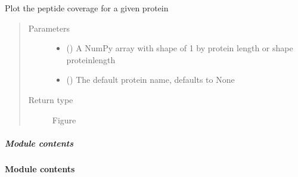 \documentclass[letterpaper,10pt,english]{sphinxmanual}
\begin{document}

\begin{fulllineitems}
\label{\detokenize{IPTK.Visualization:IPTK.Visualization.vizTools.plotly_protein_coverage}}
Plot the peptide coverage for a given protein
\begin{quote}\begin{description}
\item[{Parameters}] \leavevmode\begin{itemize}
\item {} 
 () \textendash{} A NumPy array with shape of 1 by protein length or shape protein\sphinxhyphen{}length

\item {} 
 (\sphinxstyleliteralemphasis{\sphinxupquote{, }}) \textendash{} The default protein name, defaults to None

\end{itemize}

\item[{Return type}] \leavevmode
Figure

\end{description}\end{quote}

\end{fulllineitems}



\subparagraph{Module contents}
\label{\detokenize{IPTK.Visualization:module-IPTK.Visualization}}\label{\detokenize{IPTK.Visualization:module-contents}}

\paragraph{Module contents}
\label{\detokenize{IPTK:module-IPTK}}\label{\detokenize{IPTK:module-contents}}
\end{document}
